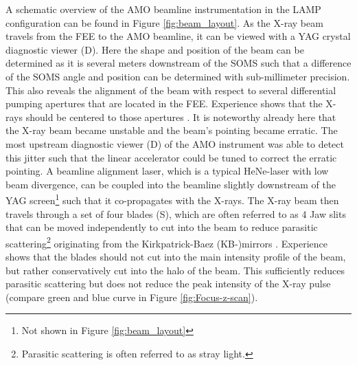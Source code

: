 A schematic overview of the AMO beamline instrumentation in the LAMP configuration can be found in Figure \ref{fig:beam_layout}. As the X-ray beam travels from the FEE to the AMO beamline, it can be viewed with a YAG crystal diagnostic viewer (D). Here the shape and position of the beam can be determined as it is several meters downstream of the SOMS such that a difference of the SOMS angle and position can be determined with sub-millimeter precision. This also reveals the alignment of the beam with respect to several differential pumping apertures that are located in the FEE. Experience shows that the X-rays should be centered to those apertures \citep{Turner-2016-PC}. It is noteworthy already here that the X-ray beam became unstable and the beam's pointing became erratic. The most upstream diagnostic viewer (D) of the AMO instrument was able to detect this jitter such that the linear accelerator could be tuned to correct the erratic pointing. A beamline alignment laser, which is a typical HeNe-laser with low beam divergence, can be coupled into the beamline slightly downstream of the YAG screen\footnote{Not shown in  Figure \ref{fig:beam_layout}} such that it co-propagates with the X-rays. 
The X-ray beam then travels through a set of four blades (S), which are often referred to as 4 Jaw slits that can be moved independently to cut into the beam to reduce parasitic scattering\footnote{Parasitic scattering is often referred to as stray light.} originating from the Kirkpatrick-Baez (KB-)mirrors \citep{Kirkpatrick-1948-JOSA}.
Experience shows that the blades should not cut into the main intensity profile of the beam, but rather conservatively cut into the halo of the beam. This sufficiently reduces parasitic scattering but does not reduce the peak intensity of the X-ray pulse (compare green and blue curve in Figure \ref{fig:Focus-z-scan}).\\[1\baselineskip]
%
